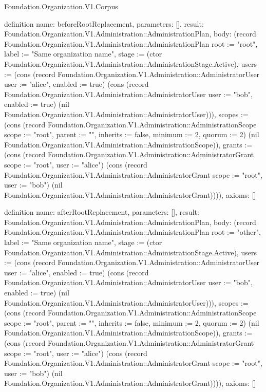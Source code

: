 \begin{lexlean}{Foundation.Organization.V1.Corpus}
\begin{semanticmodule}
definition{
  name: beforeRootReplacement,
  parameters: [],
  result: Foundation.Organization.V1.Administration::AdministrationPlan,
  body: (record Foundation.Organization.V1.Administration::AdministrationPlan {root := "root", label := "Same organization name", stage := (ctor Foundation.Organization.V1.Administration::AdministrationStage.Active), users := (cons (record Foundation.Organization.V1.Administration::AdministratorUser {user := "alice", enabled := true}) (cons (record Foundation.Organization.V1.Administration::AdministratorUser {user := "bob", enabled := true}) (nil Foundation.Organization.V1.Administration::AdministratorUser))), scopes := (cons (record Foundation.Organization.V1.Administration::AdministrationScope {scope := "root", parent := "", inherits := false, minimum := 2, quorum := 2}) (nil Foundation.Organization.V1.Administration::AdministrationScope)), grants := (cons (record Foundation.Organization.V1.Administration::AdministratorGrant {scope := "root", user := "alice"}) (cons (record Foundation.Organization.V1.Administration::AdministratorGrant {scope := "root", user := "bob"}) (nil Foundation.Organization.V1.Administration::AdministratorGrant)))}),
  axioms: []
}

definition{
  name: afterRootReplacement,
  parameters: [],
  result: Foundation.Organization.V1.Administration::AdministrationPlan,
  body: (record Foundation.Organization.V1.Administration::AdministrationPlan {root := "other", label := "Same organization name", stage := (ctor Foundation.Organization.V1.Administration::AdministrationStage.Active), users := (cons (record Foundation.Organization.V1.Administration::AdministratorUser {user := "alice", enabled := true}) (cons (record Foundation.Organization.V1.Administration::AdministratorUser {user := "bob", enabled := true}) (nil Foundation.Organization.V1.Administration::AdministratorUser))), scopes := (cons (record Foundation.Organization.V1.Administration::AdministrationScope {scope := "root", parent := "", inherits := false, minimum := 2, quorum := 2}) (nil Foundation.Organization.V1.Administration::AdministrationScope)), grants := (cons (record Foundation.Organization.V1.Administration::AdministratorGrant {scope := "root", user := "alice"}) (cons (record Foundation.Organization.V1.Administration::AdministratorGrant {scope := "root", user := "bob"}) (nil Foundation.Organization.V1.Administration::AdministratorGrant)))}),
  axioms: []
}


\end{semanticmodule}
\end{lexlean}
